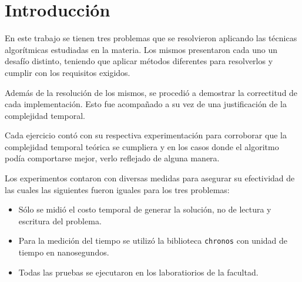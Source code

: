 \section{Introducción}

En este trabajo se tienen tres problemas que se resolvieron aplicando las
técnicas algorítmicas estudiadas en la materia. Los mismos presentaron cada uno un desafío
distinto, teniendo que aplicar métodos diferentes para resolverlos y cumplir
con los requisitos exigidos.

Además de la resolución de los mismos, se procedió a demostrar la correctitud de
cada implementación. Esto fue acompañado a su vez de una justificación de la
complejidad temporal.

Cada ejercicio contó con su respectiva experimentación para corroborar que la
complejidad temporal teórica se cumpliera y en los casos donde el algoritmo
podía comportarse mejor, verlo reflejado de alguna manera.

Los experimentos contaron con diversas medidas para asegurar su efectividad de
las cuales las siguientes fueron iguales para los tres problemas:
\begin{itemize}
	\item{Sólo se midió el costo temporal de generar la solución, no
			de lectura y escritura del problema.}
	\item{Para la medición del tiempo se utilizó la biblioteca \texttt{chronos}
			con unidad de tiempo en nanosegundos.}
	\item{Todas las pruebas se ejecutaron en los laboratiorios de la facultad.}
\end{itemize}
